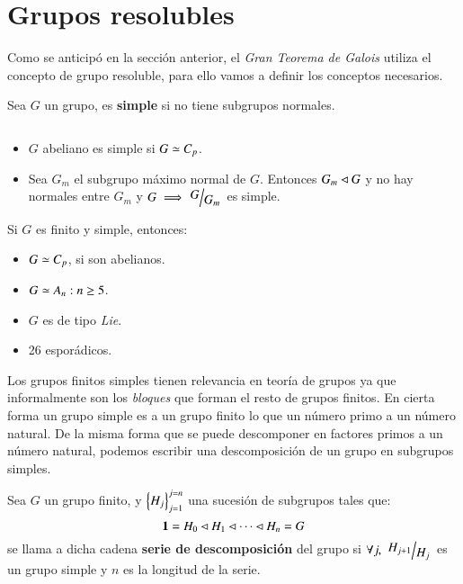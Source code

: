 \section{Grupos resolubles}
Como se anticipó en la sección anterior, el \textit{Gran Teorema de Galois} utiliza el concepto de grupo resoluble, para ello vamos a definir los conceptos necesarios.

\begin{dfn}
    Sea $G$ un grupo, es \textbf{simple} si no tiene subgrupos normales.
\end{dfn}

\begin{obs}$ $
    \begin{itemize}
        \item $G$ abeliano es simple si $G \simeq C_p$.
        \item Sea $G_m$ el subgrupo máximo normal de $G$. Entonces $G_m \lhd G$ y no hay normales entre $G_m$ y $G \implies \quo{G}{G_m}$ es simple.
    \end{itemize}
\end{obs}

\begin{obs}
    Si $G$ es finito y simple, entonces:
    \begin{itemize}
        \item $G \simeq C_p$, si son abelianos.
        \item $G \simeq A_n: n\geq5$.
        \item $G$ es de tipo \textit{Lie}.
        \item 26 esporádicos.
    \end{itemize}
\end{obs}

Los grupos finitos simples tienen relevancia en teoría de grupos ya que informalmente son los \textit{bloques} que forman el resto de grupos finitos. En cierta forma un grupo simple es a un grupo finito lo que un número primo a un número natural. De la misma forma que se puede descomponer en factores primos a un número natural, podemos escribir una descomposición de un grupo en subgrupos simples.

\begin{dfn}
    Sea $G$ un grupo finito, y $\left\{H_j\right\}_{j=1}^{j=n}$ una sucesión de subgrupos tales que:
    $$
        \mathbf{1} = H_0 \lhd H_1 \lhd \cdots \lhd H_n = G
    $$
    se llama a dicha cadena \textbf{serie de descomposición} del grupo si $\forall j,\ \quo{H_{j+1}}{H_j}$ es un grupo simple y $n$ es la longitud de la serie.
\end{dfn}

